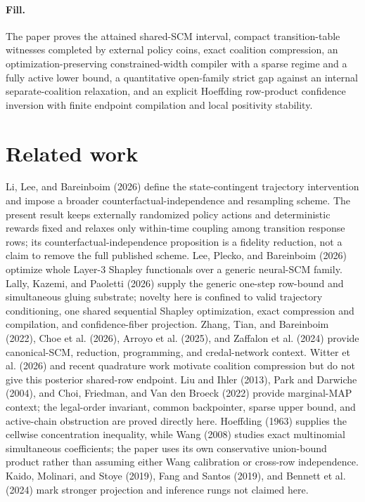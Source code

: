 \documentclass{article}
\begin{document}
\paragraph{Fill.} The paper proves the attained shared-SCM interval, compact transition-table witnesses completed by external policy coins, exact coalition compression, an optimization-preserving constrained-width compiler with a sparse regime and a fully active lower bound, a quantitative open-family strict gap against an internal separate-coalition relaxation, and an explicit Hoeffding row-product confidence inversion with finite endpoint compilation and local positivity stability.

\section{Related work}

Li, Lee, and Bareinboim (2026) define the state-contingent trajectory intervention and impose a broader counterfactual-independence and resampling scheme.  The present result keeps externally randomized policy actions and deterministic rewards fixed and relaxes only within-time coupling among transition response rows; its counterfactual-independence proposition is a fidelity reduction, not a claim to remove the full published scheme.  Lee, Plecko, and Bareinboim (2026) optimize whole Layer-3 Shapley functionals over a generic neural-SCM family.  Lally, Kazemi, and Paoletti (2026) supply the generic one-step row-bound and simultaneous gluing substrate; novelty here is confined to valid trajectory conditioning, one shared sequential Shapley optimization, exact compression and compilation, and confidence-fiber projection.  Zhang, Tian, and Bareinboim (2022), Choe et al. (2026), Arroyo et al. (2025), and Zaffalon et al. (2024) provide canonical-SCM, reduction, programming, and credal-network context.  Witter et al. (2026) and recent quadrature work motivate coalition compression but do not give this posterior shared-row endpoint.  Liu and Ihler (2013), Park and Darwiche (2004), and Choi, Friedman, and Van den Broeck (2022) provide marginal-MAP context; the legal-order invariant, common backpointer, sparse upper bound, and active-chain obstruction are proved directly here.  Hoeffding (1963) supplies the cellwise concentration inequality, while Wang (2008) studies exact multinomial simultaneous coefficients; the paper uses its own conservative union-bound product rather than assuming either Wang calibration or cross-row independence.  Kaido, Molinari, and Stoye (2019), Fang and Santos (2019), and Bennett et al. (2024) mark stronger projection and inference rungs not claimed here.
\end{document}
